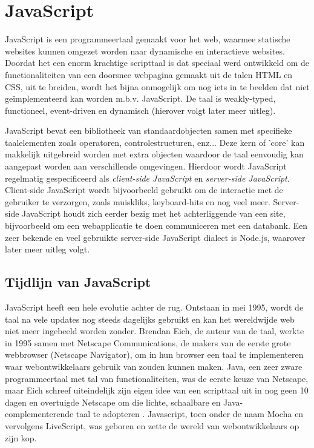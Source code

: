 \section{JavaScript}
\label{sec:javascript}

JavaScript is een programmeertaal gemaakt voor het web, waarmee statische websites kunnen omgezet worden naar dynamische en interactieve websites. Doordat het een enorm krachtige scripttaal is dat speciaal werd ontwikkeld om de functionaliteiten van een doorsnee webpagina gemaakt uit de talen HTML en CSS, uit te breiden, wordt het bijna onmogelijk om nog iets in te beelden dat niet geïmplementeerd kan worden m.b.v. JavaScript. De taal is weakly-typed, functioneel, event-driven en dynamisch (hierover volgt later meer uitleg). 

JavaScript bevat een bibliotheek van standaardobjecten samen met specifieke taalelementen zoals operatoren, controlestructuren, enz... Deze kern of 'core' kan makkelijk uitgebreid worden met extra objecten waardoor de taal eenvoudig kan aangepast worden aan verschillende omgevingen. Hierdoor wordt JavaScript regelmatig gespecificeerd als \textit{client-side JavaScript} en \textit{server-side JavaScript}. Client-side JavaScript wordt bijvoorbeeld gebruikt om de interactie met de gebruiker te verzorgen, zoals muiskliks, keyboard-hits en nog veel meer. Server-side JavaScript houdt zich eerder bezig met het achterliggende van een site, bijvoorbeeld om een webapplicatie te doen communiceren met een databank. Een zeer bekende en veel gebruikte server-side JavaScript dialect is Node.js, waarover later meer uitleg volgt. \autocite{Javascript2019}

\subsection{Tijdlijn van JavaScript}
\label{sec:jsTimeline}

JavaScript heeft een hele evolutie achter de rug. Ontstaan in mei 1995, wordt de taal na vele updates nog steeds dagelijks gebruikt en kan het wereldwijde web niet meer ingebeeld worden zonder. Brendan Eich, de auteur van de taal, werkte in 1995 samen met Netscape Communications, de makers van de eerste grote webbrowser (Netscape Navigator), om in hun browser een taal te implementeren waar webontwikkelaars gebruik van zouden kunnen maken. Java, een zeer zware programmeertaal met tal van functionaliteiten, was de eerste keuze van Netscape, maar Eich schreef uiteindelijk zijn eigen idee van een scripttaal uit in nog geen 10 dagen en overtuigde Netscape om die lichte, schaalbare en Java-complementerende taal te adopteren \autocite{Rangpariya2019}. Javascript, toen onder de naam Mocha en vervolgens LiveScript, was geboren en zette de wereld van webontwikkelaars op zijn kop.

